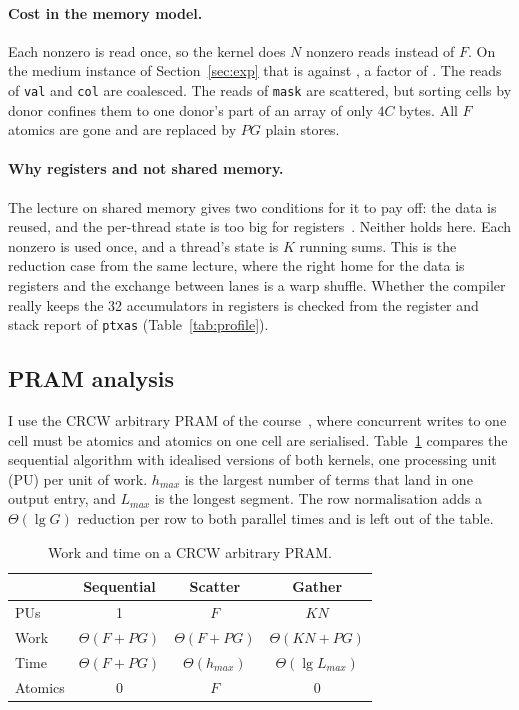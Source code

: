\documentclass[sigconf,nonacm]{acmart}
\newcommand{\code}[1]{\texttt{#1}}
\begin{document}
\paragraph{Cost in the memory model.} Each nonzero is read once, so the kernel does $N$ nonzero
reads instead of $F$. On the medium instance of Section~\ref{sec:exp} that is \NnzMedium{} against
\TermsMedium{}, a factor of \SelPerCellMedium{}. The reads of \code{val} and \code{col} are
coalesced. The reads of \code{mask} are scattered, but sorting cells by donor confines them to one
donor's part of an array of only $4C$ bytes. All $F$ atomics are gone and are replaced by $PG$ plain
stores.

\paragraph{Why registers and not shared memory.} The lecture on shared memory gives two conditions
for it to pay off: the data is reused, and the per-thread state is too big for
registers~\cite{csc586f}. Neither holds here. Each nonzero is used once, and a thread's state is $K$
running sums. This is the reduction case from the same lecture, where the right home for the data is
registers and the exchange between lanes is a warp shuffle. Whether the compiler really keeps the 32
accumulators in registers is checked from the register and stack report of \code{ptxas}
(Table~\ref{tab:profile}).

\subsection{PRAM analysis}

I use the CRCW arbitrary PRAM of the course~\cite{casanova2008,csc586f}, where concurrent writes to
one cell must be atomics and atomics on one cell are serialised. Table~\ref{tab:pram} compares the
sequential algorithm with idealised versions of both kernels, one processing unit (PU) per unit of
work. $h_{max}$ is the largest number of terms that land in one output entry, and $L_{max}$ is the
longest segment. The row normalisation adds a $\Theta(\lg G)$ reduction per row to both parallel
times and is left out of the table.

\begin{table}[t]
\caption{Work and time on a CRCW arbitrary PRAM.}
\label{tab:pram}
\small
\begin{tabular}{@{}lccc@{}}
\toprule
 & Sequential & Scatter & Gather \\
\midrule
PUs & 1 & $F$ & $KN$ \\
Work & $\Theta(F + PG)$ & $\Theta(F + PG)$ & $\Theta(KN + PG)$ \\
Time & $\Theta(F + PG)$ & $\Theta(h_{max})$ & $\Theta(\lg L_{max})$ \\
Atomics & 0 & $F$ & 0 \\
\bottomrule
\end{tabular}
\end{table}
\end{document}
